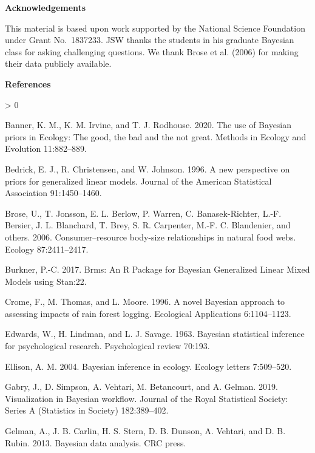 \documentclass[
  12pt,
]{article}
\newlength{\cslhangindent}
\newenvironment{CSLReferences}[2] %
 {%
  \setlength{\parindent}{0pt}
  \ifodd #1 \everypar{\setlength{\hangindent}{\cslhangindent}}\ignorespaces\fi
  \ifnum #2 > 0
  \setlength{\parskip}{#2\baselineskip}
  \fi
 }%
 {}
\begin{document}
\textbf{Acknowledgements}

This material is based upon work supported by the National Science
Foundation under Grant No.~1837233. JSW thanks the students in his
graduate Bayesian class for asking challenging questions. We thank Brose
et al. (2006) for making their data publicly available.

\textbf{References}

\hypertarget{refs}{}
\begin{CSLReferences}{1}{0}
\leavevmode\hypertarget{ref-banner_use_2020}{}%
Banner, K. M., K. M. Irvine, and T. J. Rodhouse. 2020. The use of
{Bayesian} priors in {Ecology}: {The} good, the bad and the not great.
Methods in Ecology and Evolution 11:882--889.

\leavevmode\hypertarget{ref-bedrick_new_1996}{}%
Bedrick, E. J., R. Christensen, and W. Johnson. 1996. A new perspective
on priors for generalized linear models. Journal of the American
Statistical Association 91:1450--1460.

\leavevmode\hypertarget{ref-brose_consumerresource_2006}{}%
Brose, U., T. Jonsson, E. L. Berlow, P. Warren, C. Banasek-Richter,
L.-F. Bersier, J. L. Blanchard, T. Brey, S. R. Carpenter, M.-F. C.
Blandenier, and others. 2006. Consumer--resource body-size relationships
in natural food webs. Ecology 87:2411--2417.

\leavevmode\hypertarget{ref-burkner_brms_2017}{}%
Burkner, P.-C. 2017. Brms: {An} {R} {Package} for {Bayesian}
{Generalized} {Linear} {Mixed} {Models} using {Stan}:22.

\leavevmode\hypertarget{ref-crome_novel_1996}{}%
Crome, F., M. Thomas, and L. Moore. 1996. A novel {Bayesian} approach to
assessing impacts of rain forest logging. Ecological Applications
6:1104--1123.

\leavevmode\hypertarget{ref-edwards_bayesian_1963}{}%
Edwards, W., H. Lindman, and L. J. Savage. 1963. Bayesian statistical
inference for psychological research. Psychological review 70:193.

\leavevmode\hypertarget{ref-ellison_bayesian_2004}{}%
Ellison, A. M. 2004. Bayesian inference in ecology. Ecology letters
7:509--520.

\leavevmode\hypertarget{ref-gabry_visualization_2019}{}%
Gabry, J., D. Simpson, A. Vehtari, M. Betancourt, and A. Gelman. 2019.
Visualization in {Bayesian} workflow. Journal of the Royal Statistical
Society: Series A (Statistics in Society) 182:389--402.

\leavevmode\hypertarget{ref-gelman_bayesian_2013}{}%
Gelman, A., J. B. Carlin, H. S. Stern, D. B. Dunson, A. Vehtari, and D.
B. Rubin. 2013. Bayesian data analysis. CRC press.


\end{CSLReferences}
\end{document}
